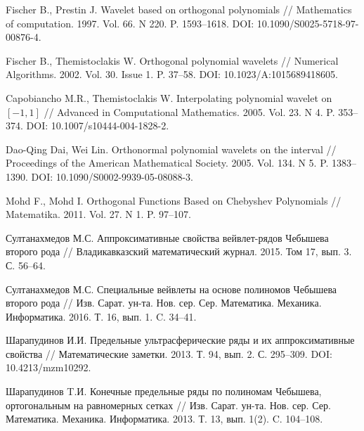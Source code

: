 \begin{thebibliography}{999}

 Fischer B., Prestin J. Wavelet based on orthogonal polynomials // Mathematics of computation. 1997. Vol. 66. N 220. P. 1593--1618. DOI: 10.1090/S0025-5718-97-00876-4.




 Fischer B., Themistoclakis W. Orthogonal polynomial wavelets // Numerical Algorithms. 2002. Vol. 30. Issue 1. P. 37--58. DOI: 10.1023/A:1015689418605.




 Capobiancho M.R., Themistoclakis W. Interpolating polynomial wavelet on $[-1,1]$ // Advanced in Computational Mathematics. 2005. Vol. 23. N 4. P. 353--374. DOI: 10.1007/s10444-004-1828-2.




 Dao-Qing Dai, Wei Lin. Orthonormal polynomial wavelets on the interval // Proceedings of the American Mathematical Society. 2005. Vol. 134. N 5. P. 1383--1390. DOI: 10.1090/S0002-9939-05-08088-3.




 Mohd F., Mohd I. Orthogonal Functions Based on Chebyshev Polynomials // Matematika. 2011. Vol. 27. N 1. P. 97--107.




 Султанахмедов М.С. Аппроксимативные свойства вейвлет-рядов Чебышева второго рода  // Владикавказский математический журнал. 2015. Том 17, вып. 3. С. 56--64.




 Султанахмедов М.С. Специальные вейвлеты на основе полиномов Чебышева второго рода  //
Изв. Сарат. ун-та. Нов. сер. Сер. Математика. Механика. Информатика. 2016. Т. 16, вып. 1. C. 34--41.





 Шарапудинов И.И. Предельные ультрасферические ряды и их аппроксимативные свойства // Математические заметки. 2013. Т. 94, вып. 2. С. 295--309. DOI: 10.4213/mzm10292.




 Шарапудинов T.И.
Конечные предельные ряды по полиномам Чебышева, ортогональным на равномерных сетках
// Изв. Сарат. ун-та. Нов. сер. Сер. Математика. Механика. Информатика. 2013. Т. 13, вып. 1(2). C. 104--108.





\end{thebibliography}
